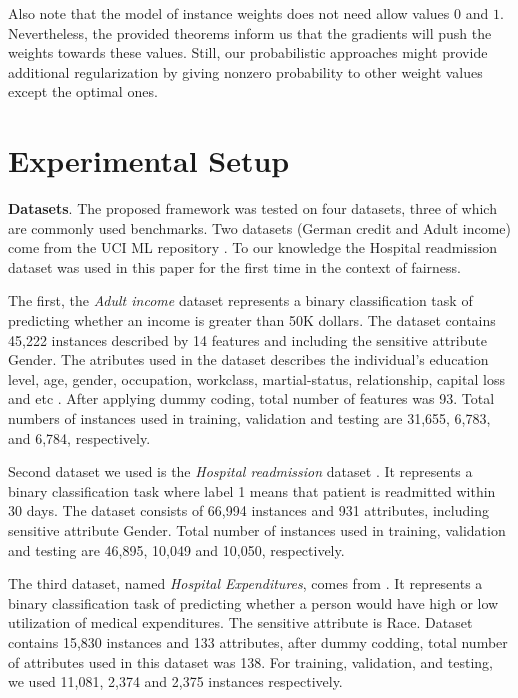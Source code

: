 \documentclass[preprint,12pt]{elsarticle}
\begin{document}
Also note that the model of instance weights does not need allow values $0$ and $1$. Nevertheless, the provided theorems inform us that the gradients will push the weights towards these values. Still, our probabilistic approaches might provide additional regularization by giving nonzero probability to other weight values except the optimal ones.



\section{Experimental Setup}
\label{Sec:exp-evaluation}

\textbf{Datasets}. The proposed framework was tested on four datasets, three of which are commonly used benchmarks. Two datasets (German credit and Adult income) come from the UCI ML repository \cite{frank2011uci}. To our knowledge the Hospital readmission dataset was used in this paper for the first time in the context of fairness.

The first, the \textit{Adult income} dataset \cite{kohavi1996scaling} represents a binary classification task of predicting whether an income is greater than 50K dollars. The dataset contains 45,222 instances described by 14 features and including the sensitive attribute Gender. The atributes used in the dataset describes the individual's education level, age, gender, occupation, workclass, martial-status, relationship, capital loss and etc \cite{Dua:2019}. After applying dummy coding, total number of features was 93. Total numbers of instances used in training, validation and testing are 31,655, 6,783, and 6,784, respectively.

Second dataset we used is the \textit{Hospital readmission} dataset \cite{stiglic2015comprehensible}. It represents a binary classification task where label 1 means that patient is readmitted within 30 days. The dataset consists of 66,994 instances and 931 attributes, including sensitive attribute Gender. Total number of instances used in training, validation and testing are 46,895, 10,049 and 10,050, respectively.

The third dataset, named \textit{Hospital Expenditures}, comes from \cite{bellamy2019ai}. It represents a binary classification task of predicting whether a person would have high or low utilization of medical expenditures. The sensitive attribute is Race. Dataset contains 15,830 instances and 133 attributes, after dummy codding, total number of attributes used in this dataset was 138. For training, validation, and testing, we used 11,081, 2,374 and 2,375 instances respectively.
\end{document}
